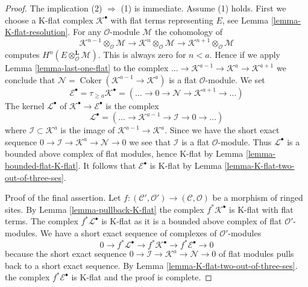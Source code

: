 \documentclass[10pt,a4paper]{amsart}
\theoremstyle{plain}
\theoremstyle{definition}
\theoremstyle{remark}
\numberwithin{equation}{subsection}
\def\Coker{\mathop{\mathrm{Coker}}}
\begin{document}
\begin{proof}
The implication (2) $\Rightarrow$ (1) is immediate. Assume (1) holds.
First we choose a K-flat complex $\mathcal{K}^\bullet$
with flat terms representing $E$, see Lemma \ref{lemma-K-flat-resolution}.
For any $\mathcal{O}$-module $\mathcal{M}$ the cohomology of
$$
\mathcal{K}^{n - 1} \otimes_\mathcal{O} \mathcal{M} \to
\mathcal{K}^n \otimes_\mathcal{O} \mathcal{M} \to
\mathcal{K}^{n + 1} \otimes_\mathcal{O} \mathcal{M}
$$
computes $H^n(E \otimes_\mathcal{O}^\mathbf{L} \mathcal{M})$.
This is always zero for $n < a$. Hence if we apply
Lemma \ref{lemma-last-one-flat} to the complex
$\ldots \to \mathcal{K}^{a - 1} \to \mathcal{K}^a \to \mathcal{K}^{a + 1}$
we conclude that $\mathcal{N} = \Coker(\mathcal{K}^{a - 1} \to \mathcal{K}^a)$
is a flat $\mathcal{O}$-module. We set
$$
\mathcal{E}^\bullet = \tau_{\geq a}\mathcal{K}^\bullet =
(\ldots \to 0 \to \mathcal{N} \to \mathcal{K}^{a + 1} \to \ldots )
$$
The kernel $\mathcal{L}^\bullet$ of
$\mathcal{K}^\bullet \to \mathcal{E}^\bullet$ is the complex
$$
\mathcal{L}^\bullet = (\ldots \to \mathcal{K}^{a - 1} \to
\mathcal{I} \to 0 \to \ldots)
$$
where $\mathcal{I} \subset \mathcal{K}^a$ is the image of
$\mathcal{K}^{a - 1} \to \mathcal{K}^a$.
Since we have the short exact sequence
$0 \to \mathcal{I} \to \mathcal{K}^a \to \mathcal{N} \to 0$
we see that $\mathcal{I}$ is a flat $\mathcal{O}$-module.
Thus $\mathcal{L}^\bullet$ is a bounded
above complex of flat modules, hence K-flat by
Lemma \ref{lemma-bounded-flat-K-flat}.
It follows that $\mathcal{E}^\bullet$ is K-flat by
Lemma \ref{lemma-K-flat-two-out-of-three-ses}.

\medskip\noindent
Proof of the final assertion. Let
$f : (\mathcal{C}', \mathcal{O}') \to (\mathcal{C}, \mathcal{O})$
be a morphism of ringed sites. By Lemma \ref{lemma-pullback-K-flat}
the complex $f^*\mathcal{K}^\bullet$ is K-flat with flat terms.
The complex $f^*\mathcal{L}^\bullet$ is K-flat as it is a bounded
above complex of flat $\mathcal{O}'$-modules. We have a short exact
sequence of complexes of $\mathcal{O}'$-modules
$$
0 \to f^*\mathcal{L}^\bullet \to f^*\mathcal{K}^\bullet \to
f^*\mathcal{E}^\bullet \to 0
$$
because the short exact sequence
$0 \to \mathcal{I} \to \mathcal{K}^a \to \mathcal{N} \to 0$
of flat modules pulls back to a short exact sequence.
By Lemma \ref{lemma-K-flat-two-out-of-three-ses}.
the complex $f^*\mathcal{E}^\bullet$ is K-flat and the proof is complete.
\end{proof}
\end{document}
